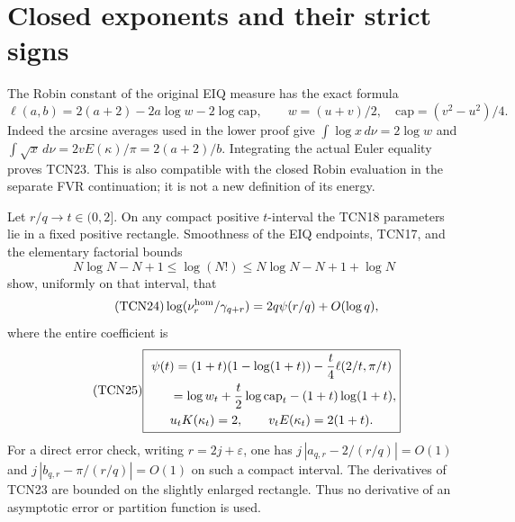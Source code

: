 \documentclass[11pt,a4paper]{article}
\begin{document}
\section{Closed exponents and their strict signs}

The Robin constant of the original EIQ measure has the exact formula
\begin{equation}\tag{TCN23}
 \ell(a,b)=2(a+2)-2a\log w-2\log\mathrm{cap},\qquad
 w=(u+v)/2,\quad\mathrm{cap}=(v^2-u^2)/4.
\end{equation}
Indeed the arcsine averages used in the lower proof give
$\int\log x\,d\nu=2\log w$ and
$\int\sqrt x\,d\nu=2vE(\kappa)/\pi=2(a+2)/b$.
Integrating the actual Euler equality proves TCN23.
This is also compatible with the closed Robin evaluation in the
separate FVR continuation; it is not a new definition of its energy.

Let $r/q\to t\in(0,2]$. On any compact positive $t$-interval the
TCN18 parameters lie in a fixed positive rectangle. Smoothness of the
EIQ endpoints, TCN17, and the elementary factorial bounds
\[
 N\log N-N+1\le\log(N!)\le N\log N-N+1+\log N
\]
show, uniformly on that interval, that
\begin{equation}\tag{TCN24}
 \log(\nu_r^{\rm hom}/\gamma_{q+r})
 =2q\psi(r/q)+O(\log q),
\end{equation}
where the entire coefficient is
\begin{equation}\tag{TCN25}\label{tcn:psi}
 \boxed{\begin{gathered}
 \psi(t)=(1+t)(1-\log(1+t))
                     -\frac{t}{4}\ell(2/t,\pi/t)\\
 \hphantom{\psi(t)}=\log w_t+\frac t2\log\mathrm{cap}_t
                         -(1+t)\log(1+t),\\
 u_tK(\kappa_t)=2,\qquad v_tE(\kappa_t)=2(1+t).
 \end{gathered}}
\end{equation}
For a direct error check, writing $r=2j+\varepsilon$, one has
$j\,|a_{q,r}-2/(r/q)|=O(1)$ and
$j\,|b_{q,r}-\pi/(r/q)|=O(1)$ on such a compact interval.
The derivatives of TCN23 are bounded on the slightly enlarged rectangle.
Thus no derivative of an asymptotic error or partition function is used.
\end{document}
